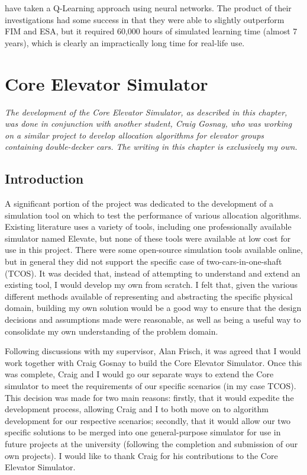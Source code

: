 \documentclass{UoYCSproject}
\begin{document}
\citet{Crites1998} have taken a Q-Learning approach using neural networks.  The product of their investigations had some success in that they were able to slightly outperform FIM and ESA, but it required 60,000 hours of simulated learning time (almost 7 years), which is clearly an impractically long time for real-life use.

\chapter{Core Elevator Simulator}
\label{ceschapter}

\textit{The development of the Core Elevator Simulator, as described in this chapter, was done in conjunction with another student, Craig Gosnay, who was working on a similar project to develop allocation algorithms for elevator groups containing double-decker cars.  The writing in this chapter is exclusively my own.}

\section{Introduction}

A significant portion of the project was dedicated to the development of a simulation tool on which to test the performance of various allocation algorithms.  Existing literature uses a variety of tools, including one professionally available simulator named Elevate, but none of these tools were available at low cost for use in this project.  There were some open-source simulation tools available online, but in general they did not support the specific case of two-cars-in-one-shaft (TCOS).  It was decided that, instead of attempting to understand and extend an existing tool, I would develop my own from scratch.  I felt that, given the various different methods available of representing and abstracting the specific physical domain, building my own solution would be a good way to ensure that the design decisions and assumptions made were reasonable, as well as being a useful way to consolidate my own understanding of the problem domain.

Following discussions with my supervisor, Alan Frisch, it was agreed that I would work together with Craig Gosnay to build the Core Elevator Simulator.  Once this was complete, Craig and I would go our separate ways to extend the Core simulator to meet the requirements of our specific scenarios (in my case TCOS).  This decision was made for two main reasons: firstly, that it would expedite the development process, allowing Craig and I to both move on to algorithm development for our respective scenarios; secondly, that it would allow our two specific solutions to be merged into one general-purpose simulator for use in future projects at the university (following the completion and submission of our own projects).  I would like to thank Craig for his contributions to the Core Elevator Simulator.
\end{document}

